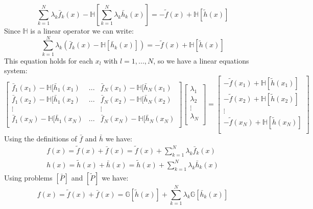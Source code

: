 \[
\sum_{k=1}^N\lambda_k\bar f_k(x)-\mathbb{H}\left[\sum_{k=1}^N\lambda_k \bar h_k(x) \right] =-\widetilde{f}(x)+\mathbb{H}[\widetilde{h}(x)]
\]
Since $\mathbb{H}$ is a linear operator we can write:
\[
\sum_{k=1}^N\lambda_k\left(\bar f_k(x)-\mathbb{H}[\bar h_k(x)] \right) =-\widetilde{f}(x)+\mathbb{H}[\widetilde{h}(x)]
\]
This equation holds for each $x_l$ with $l=1,...,N$, so we have a linear equations system:
\begin{equation}
\begin{bmatrix}
\bar f_1(x_1)-\mathbb{H}[\bar h_1(x_1) & ... & \bar f_N(x_1)-\mathbb{H}[\bar h_N(x_1)\\
\bar f_1(x_2)-\mathbb{H}[\bar h_1(x_2) & ... & \bar f_N(x_2)-\mathbb{H}[\bar h_N(x_2)\\
\vdots & &\vdots\\
\bar f_1(x_N)-\mathbb{H}[\bar h_1(x_N) & ... & \bar f_N(x_N)-\mathbb{H}[\bar h_N(x_N)\\
\end{bmatrix}
\begin{bmatrix}
\lambda_1\\
\lambda_2\\
\vdots\\
\lambda_N\\
\end{bmatrix}
=
\begin{bmatrix}
-\widetilde{f}(x_1)+\mathbb{H}[\widetilde{h}(x_1)]\\
-\widetilde{f}(x_2)+\mathbb{H}[\widetilde{h}(x_2)]\\
\vdots\\
-\widetilde{f}(x_N)+\mathbb{H}[\widetilde{h}(x_N)]\\
\end{bmatrix}
\end{equation}
Using the definitions of $\bar f$ and $\bar h$ we have:
\[
\begin{array}{l}
f(x)=\widetilde{f}(x)+\bar f(x)=\widetilde{f}(x)+\sum\limits_{k=1}^N\lambda_k\bar f_k(x)\\[2ex]
h(x)=\widetilde{h}(x)+\bar h(x)=\widetilde{h}(x)+\sum\limits_{k=1}^N\lambda_k\bar h_k(x)
\end{array}
\]
Using problems $[\bar P]$ and $[\widetilde{P}]$ we have:
\[
f(x)=\widetilde{f}(x)+\bar f(x)=\mathbb{G}[\widetilde{h}(x)]+\sum_{k=1}^N \lambda_k \mathbb{G}[\bar h_k(x)]
\]

